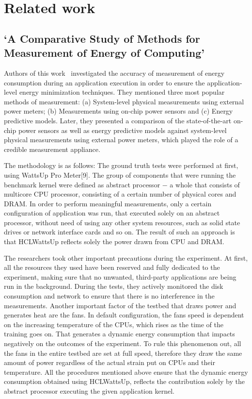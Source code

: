 \chapter{Related work}

\section{`A Comparative Study of Methods for Measurement
of Energy of Computing'}

Authors of this work~\cite{State_of_the_Art_Article_1}
investigated the accuracy of measurement of energy consumption
during an application execution in order to ensure the
application-level energy minimization techniques.
They mentioned three most popular methods of measurement:
(a) System-level physical measurements using external power meters;
(b) Measurements using on-chip power sensors and (c) Energy
predictive models. Later, they presented a comparison of the
state-of-the-art on-chip power sensors as well as energy
predictive models against system-level physical measurements
using external power meters, which played the role of a credible
measurement appliance.

The methodology is as follows: The ground truth tests were
performed at first, using WattsUp Pro Meter[9]. The group of
components that were running the benchmark kernel were defined
as abstract processor $-$ a whole that consists of multicore CPU
processor, consisting of a certain number of physical cores and
DRAM\@. In order to perform meaningful measurements, only a certain
configuration of application was run, that executed solely on an
abstract processor, without need of using any other system
resources, such as solid state drives or network interface cards
and so on. The result of such an approach is that HCLWattsUp
reflects solely the power drawn from CPU and DRAM\@.

The researchers took other important precautions during the
experiment. At first, all the resources they used have been
reserved and fully dedicated to the experiment, making sure
that no unwanted, third-party applications are being run in
the background. During the tests, they actively monitored the
disk consumption and network to ensure that there is no
interference in the measurements. Another important factor of
the testbed that draws power and generates heat are the fans.
In default configuration, the fans speed is dependent on the
increasing temperature of the CPUs, which rises as the time of
the training goes on. That generates a dynamic energy consumption
that impacts negatively on the outcomes of the experiment.
To rule this phenomenon out, all the fans in the entire testbed
are set at full speed, therefore they draw the same amount of
power regardless of the actual strain put on CPUs and their
temperature. All the procedures mentioned above ensure that the
dynamic energy consumption obtained using HCLWattsUp, reflects
the contribution solely by the abstract processor executing the
given application kernel.

